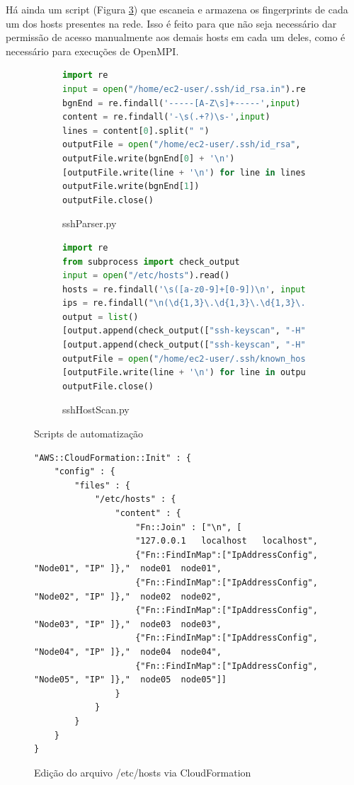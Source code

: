 \documentclass[tg]{mdtufsm}
\begin{document}
Há ainda um script (Figura \ref{hostScan}) que escaneia e armazena os fingerprints de cada um dos hosts presentes na rede. Isso é feito para que não seja necessário dar permissão de acesso manualmente aos demais hosts em cada um deles, como é necessário para execuções de OpenMPI.

\begin{figure}
\centering
\begin{subfigure}[c]{1\textwidth}
\begin{lstlisting}[frame=single, language=Python, numbers=none]
import re
input = open("/home/ec2-user/.ssh/id_rsa.in").read()
bgnEnd = re.findall('-----[A-Z\s]+-----',input)
content = re.findall('-\s(.+?)\s-',input)
lines = content[0].split(" ")
outputFile = open("/home/ec2-user/.ssh/id_rsa", "w")
outputFile.write(bgnEnd[0] + '\n')
[outputFile.write(line + '\n') for line in lines]
outputFile.write(bgnEnd[1])
outputFile.close()
\end{lstlisting}
\caption{sshParser.py}
\label{sshKeyParser}
\end{subfigure}

\begin{subfigure}[c]{1\textwidth}
\begin{lstlisting}[frame=single, language=Python, numbers=none]
import re
from subprocess import check_output
input = open("/etc/hosts").read()
hosts = re.findall('\s([a-z0-9]+[0-9])\n', input)
ips = re.findall("\n(\d{1,3}\.\d{1,3}\.\d{1,3}\.\d{1,3})\s", input)
output = list()
[output.append(check_output(["ssh-keyscan", "-H", ip])) for ip in ips]
[output.append(check_output(["ssh-keyscan", "-H", host])) for host in hosts]
outputFile = open("/home/ec2-user/.ssh/known_hosts", "w")
[outputFile.write(line + '\n') for line in output]
outputFile.close()
\end{lstlisting}
\caption{sshHostScan.py}
\label{hostScan}
\end{subfigure}
\caption{Scripts de automatização}
\end{figure}

\begin{figure}
\centering
\begin{lstlisting}[frame=single, numbers=none]
"AWS::CloudFormation::Init" : {
	"config" : {
		"files" : {
			"/etc/hosts" : {
				"content" : {
					"Fn::Join" : ["\n", [
					"127.0.0.1   localhost   localhost",
					{"Fn::FindInMap":["IpAddressConfig", "Node01", "IP" ]},"  node01  node01",
					{"Fn::FindInMap":["IpAddressConfig", "Node02", "IP" ]},"  node02  node02",
					{"Fn::FindInMap":["IpAddressConfig", "Node03", "IP" ]},"  node03  node03",
					{"Fn::FindInMap":["IpAddressConfig", "Node04", "IP" ]},"  node04  node04",
					{"Fn::FindInMap":["IpAddressConfig", "Node05", "IP" ]},"  node05  node05"]]
				}
			}
		}	
	}
}
\end{lstlisting}
\caption{Edição do arquivo /etc/hosts via CloudFormation}
\label{hostFile}
\end{figure}
\end{document}
